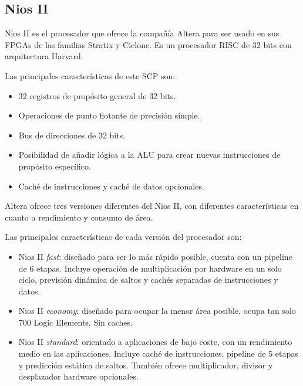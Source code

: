 	\subsection{Nios II}

Nios II es el procesador que ofrece la compañía Altera para ser usado en sus FPGAs de las familias Stratix y Ciclone. Es un procesador RISC de 32 bits con arquitectura Harvard.

 Las principales características de este SCP son:

		\begin{itemize}
		  \item  32 registros de propósito general de 32 bits.
	 	 \item  Operaciones de punto flotante de precisión simple.
	 	 \item  Bus de direcciones de 32 bits.
		 \item  Posibilidad de añadir lógica a la ALU para crear nuevas instrucciones de propósito específico.
 		\item Caché de instrucciones y caché de datos opcionales.
		\end{itemize}
  
Altera ofrece tres versiones diferentes del Nios II, con diferentes características en cuanto a rendimiento y consumo de área.

 Las principales características de cada versión del procesador son:
   
		\begin{itemize}
		  \item Nios II \textit{fast}: diseñado para ser lo más rápido posible, cuenta con un pipeline de 6 etapas. Incluye operación de multiplicación por hardware en un solo ciclo, previsión dinámica de saltos y cachés separadas de instrucciones y datos.
	 	 \item Nios II \textit{economy}: diseñado para ocupar la menor área posible, ocupa tan solo 700 Logic Elements. Sin caches.
 		\item Nios II \textit{standard}: orientado a aplicaciones de bajo coste, con un rendimiento medio en las aplicaciones. Incluye caché de instrucciones, pipeline de 5 etapas y predicción estática de saltos. También ofrece multiplicador, divisor y desplazador hardware opcionales.
		\end{itemize}


